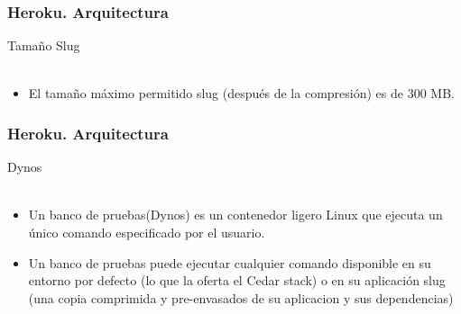\documentclass{beamer}
\begin{document}
\begin{frame}
		\frametitle{Heroku. Arquitectura}
	\centering Tamaño Slug\\ \ \\

	\begin{itemize}
		\item El tamaño máximo permitido slug (después de la compresión) es de 300 MB. 
		\end{itemize}
	\end{frame}

\begin{frame}
		\frametitle{Heroku. Arquitectura}
	\centering Dynos\\ \ \\
	\begin{itemize}
		\item Un banco de pruebas(Dynos) es un contenedor ligero Linux que ejecuta un único comando especificado por el usuario.
		\item  Un banco de pruebas puede ejecutar cualquier comando disponible en su entorno por defecto (lo que la oferta el Cedar stack) o en su aplicación slug (una copia comprimida y pre-envasados de su aplicacion y sus dependencias)
	\end{itemize}
\end{frame}
\end{document}
